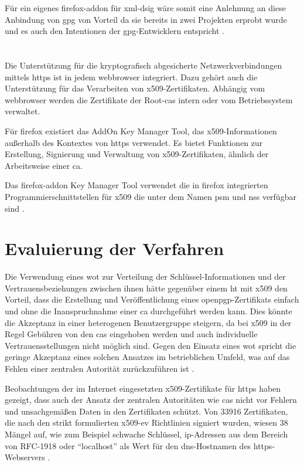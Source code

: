 Für ein eigenes \gls{firefox-addon} für \gls{xml-dsig} wäre somit eine Anlehnung an diese Anbindung von \gls{gpg} von Vorteil da sie bereits in zwei Projekten
erprobt wurde und es auch den Intentionen der \gls{gpg}-Entwicklern entspricht \cite{pgp}.

\section{\protect{}}
\label{sec:Signaturverfahren:x509}
Die Unterstützung für die kryptografisch abgesicherte Netzwerkverbindungen mittels \gls{https} ist in jedem \gls{webbrowser} integriert. Dazu gehört auch die
Unterstützung für das Verarbeiten von \gls{x509}-Zertifikaten. Abhängig vom \gls{webbrowser} werden die Zertifikate der Root-\glspl{ca} intern oder vom
Betriebssystem verwaltet.

Für \gls{firefox} existiert das AddOn Key Manager Tool, das \gls{x509}-Informationen außerhalb des Kontextes von \gls{https} verwendet. Es bietet Funktionen zur
Erstellung, Signierung und Verwaltung von \gls{x509}-Zertifikaten, ähnlich der Arbeitsweise einer \gls{ca}. 

Das \gls{firefox-addon} Key  Manager Tool verwendet die in \gls{firefox} integrierten Programmierschnittstellen für \gls{x509} die unter dem Namen \gls{psm}
und \gls{nss} verfügbar sind \cite{key-manager-tool}. 

\section{Evaluierung der Verfahren}
Die Verwendung eines \gls{wot} zur Verteilung der Schlüssel-Informationen und der Vertrauensbeziehungen zwischen ihnen hätte gegenüber einem \gls{ht} mit
\gls{x509} den Vorteil, dass die Erstellung und Veröffentlichung eines \gls{openpgp}-Zertifikats einfach und ohne die Inanspruchnahme einer \gls{ca}
durchgeführt werden kann. Dies könnte die Akzeptanz in einer heterogenen Benutzergruppe steigern, da bei \gls{x509} in der Regel Gebühren von den \glspl{ca}
eingehoben werden und auch individuelle Vertrauensstellungen nicht möglich sind. Gegen den Einsatz eines \gls{wot} spricht die geringe Akzeptanz eines solchen
Ansatzes im betrieblichen Umfeld, was auf das Fehlen einer zentralen Autorität zurückzuführen ist \cite{krypto-pki-internet}.

Beobachtungen der im Internet eingesetzten \gls{x509}-Zertifikate für \gls{https} haben gezeigt, dass auch der Ansatz der zentralen Autoritäten wie \glspl{ca}
nicht vor Fehlern und unsachgemäßen Daten in den Zertifikaten schützt. Von 33916 Zertifikaten, die nach den strikt formulierten \gls{x509-ev} Richtlinien
\cite{ev-ssl} signiert wurden, wiesen 38 Mängel auf, wie zum Beispiel schwache Schlüssel, \gls{ip}-Adressen aus dem Bereich von RFC-1918 oder "`localhost"' als
Wert für den \gls{dns}-Hostnamen des \gls{https}-Webservers \cite{ssliverse:27c3}.

